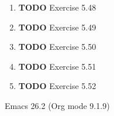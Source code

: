 \documentclass[11pt]{article}
\begin{document}
\begin{enumerate}
\begin{enumerate}
\item {\bfseries\sffamily TODO} Exercise 5.48
\label{sec:org3e1af6a}

\item {\bfseries\sffamily TODO} Exercise 5.49
\label{sec:org03b7916}

\item {\bfseries\sffamily TODO} Exercise 5.50
\label{sec:orgd819975}

\item {\bfseries\sffamily TODO} Exercise 5.51
\label{sec:org6c6f118}

\item {\bfseries\sffamily TODO} Exercise 5.52
\label{sec:orgbdd3ebb}
\end{enumerate}
\end{enumerate}
Emacs 26.2 (Org mode 9.1.9)
\end{document}
